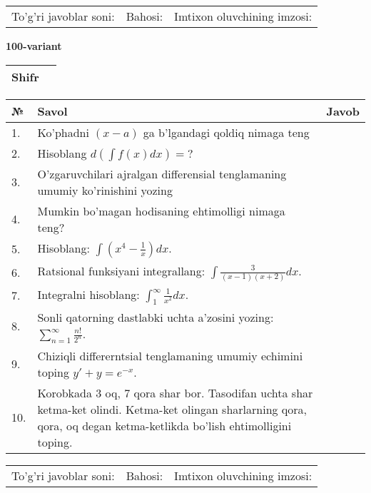 \documentclass{article}
\begin{document}
  \vspace{1cm}
  
  \begin{tabular}{lll}
  To'g'ri javoblar soni: \underline{\hspace{1.5cm}} & 
  Bahosi: \underline{\hspace{1.5cm}} & 
  Imtixon oluvchining imzosi: \underline{\hspace{2cm}} \\
  \end{tabular}
  
  \egroup
  
  \newpage
  
  
  \textbf{100-variant}\\
  
  \bgroup
  \def\arraystretch{1.6} %
  
  \begin{tabular}{|m{5.7cm}|m{9.5cm}|}
  \hline
  Shifr & \\
  \hline
  \end{tabular}
  
  \vspace{1cm}
  
  \begin{tabular}{|m{0.7cm}|m{10cm}|m{4cm}|}
  \hline
  № & Savol & Javob \\
  \hline
  1. & Ko'phadni \((x - a)\) ga b'lgandagi qoldiq nimaga teng &  \\
  \hline
  2. & Hisoblang \(d\left( \int {f(x)dx} \right) = ?\) &  \\
  \hline
  3. & O'zgaruvchilari ajralgan differensial tenglamaning umumiy ko'rinishini yozing &  \\
  \hline
  4. & Mumkin bo'magan hodisaning ehtimolligi nimaga teng? &  \\
  \hline
  5. & Hisoblang: \(\int \left( x^{4} - \frac{1}{x} \right)dx\). &  \\
  \hline
  6. & Ratsional funksiyani integrallang: \(\int {\frac{3}{(x - 1)(x + 2)}dx}\). &  \\
  \hline
  7. & Integralni hisoblang: \(\int_{1}^{\infty}{\frac{1}{x^{2}}dx}\). &  \\
  \hline
  8. & Sonli qatorning dastlabki uchta a'zosini yozing: \(\sum_{n = 1}^{\infty}\frac{n!}{2^{n}}\). &  \\
  \hline
  9. & Chiziqli differerntsial tenglamaning umumiy echimini toping \(y' + y = e^{- x}\). &  \\
  \hline
  10. & Korobkada 3 oq, 7 qora shar bor. Tasodifan uchta shar ketma-ket olindi. Ketma-ket olingan sharlarning qora, qora, oq degan ketma-ketlikda bo'lish ehtimolligini toping. &  \\
  \hline
  \end{tabular}
  
  \vspace{1cm}
  
  \begin{tabular}{lll}
  To'g'ri javoblar soni: \underline{\hspace{1.5cm}} & 
  Bahosi: \underline{\hspace{1.5cm}} & 
  Imtixon oluvchining imzosi: \underline{\hspace{2cm}} \\
  \end{tabular}
  
  \egroup
  
  \newpage
  
  
\end{document}
